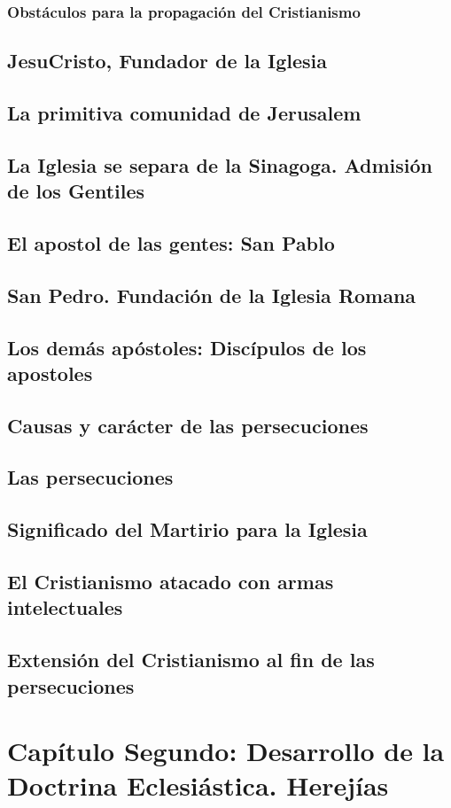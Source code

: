 \raggedbottom{} \documentclass[12pt, a4paper]{book}
\begin{document}
\subsection{Obstáculos para la propagación del Cristianismo}
\section{JesuCristo, Fundador de la Iglesia}
\section{La primitiva comunidad de Jerusalem}
\section{La Iglesia se separa de la Sinagoga. Admisión de los Gentiles}
\section{El apostol de las gentes: San Pablo}
\section{San Pedro. Fundación de la Iglesia Romana}
\section{Los demás apóstoles: Discípulos de los apostoles}
\section{Causas y carácter de las persecuciones}
\section{Las persecuciones}
\section{Significado del Martirio para la Iglesia}
\section{El Cristianismo atacado con armas intelectuales}
\section{Extensión del Cristianismo al fin de las persecuciones}
\chapter{Capítulo Segundo: Desarrollo de la Doctrina Eclesiástica. Herejías}
\end{document}
